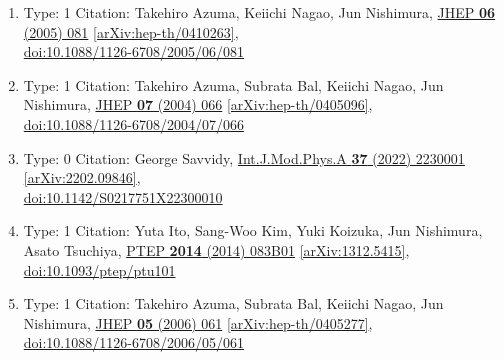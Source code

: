 \documentclass[a4paper,10pt]{article}
\begin{document}
\begin{enumerate}
\begin{enumerate}
  \item Type: 1 Citation: Takehiro Azuma, Keiichi Nagao, Jun Nishimura, \href{https://www.doi.org/10.1088/1126-6708/2005/06/081}{JHEP {\bf 06} (2005) 081}  \href{https://arxiv.org/abs/hep-th/0410263}{[arXiv:hep-th/0410263]},\\\href{https://www.doi.org/10.1088/1126-6708/2005/06/081}{doi:10.1088/1126-6708/2005/06/081}
  \item Type: 1 Citation: Takehiro Azuma, Subrata Bal, Keiichi Nagao, Jun Nishimura, \href{https://www.doi.org/10.1088/1126-6708/2004/07/066}{JHEP {\bf 07} (2004) 066}  \href{https://arxiv.org/abs/hep-th/0405096}{[arXiv:hep-th/0405096]},\\\href{https://www.doi.org/10.1088/1126-6708/2004/07/066}{doi:10.1088/1126-6708/2004/07/066}
  \item Type: 0 Citation: George Savvidy, \href{https://www.doi.org/10.1142/S0217751X22300010}{Int.J.Mod.Phys.A {\bf 37} (2022) 2230001}  \href{https://arxiv.org/abs/2202.09846}{[arXiv:2202.09846]},\\\href{https://www.doi.org/10.1142/S0217751X22300010}{doi:10.1142/S0217751X22300010}
  \item Type: 1 Citation: Yuta Ito, Sang-Woo Kim, Yuki Koizuka, Jun Nishimura, Asato Tsuchiya, \href{https://www.doi.org/10.1093/ptep/ptu101}{PTEP {\bf 2014} (2014) 083B01}  \href{https://arxiv.org/abs/1312.5415}{[arXiv:1312.5415]},\\\href{https://www.doi.org/10.1093/ptep/ptu101}{doi:10.1093/ptep/ptu101}
  \item Type: 1 Citation: Takehiro Azuma, Subrata Bal, Keiichi Nagao, Jun Nishimura, \href{https://www.doi.org/10.1088/1126-6708/2006/05/061}{JHEP {\bf 05} (2006) 061}  \href{https://arxiv.org/abs/hep-th/0405277}{[arXiv:hep-th/0405277]},\\\href{https://www.doi.org/10.1088/1126-6708/2006/05/061}{doi:10.1088/1126-6708/2006/05/061}

\end{enumerate}
\end{enumerate}
\end{document}
